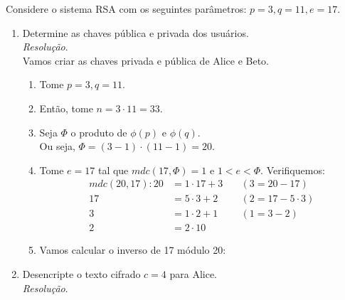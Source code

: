 Considere o sistema RSA com os seguintes parâmetros: 
$p = 3, q = 11, e = 17$. \\
\begin{enumerate}
	\item Determine as chaves pública e privada dos usuários. \\ 
	\emph{Resolução}. \\
	Vamos criar as chaves privada e pública de Alice e Beto. \\
	\begin{enumerate}
		\item Tome $p = 3, q = 11$. 
		\item Então, tome $n = 3 \cdot 11 = 33$. 
		\item Seja $\Phi$ o produto de $\phi(p)$ e $\phi(q)$. \\ 
			Ou seja, $\Phi = (3 - 1) \cdot (11 - 1) = 20$.
		\item Tome $e = 17$ tal que $mdc(17, \Phi) = 1$ e $1 < e < \Phi$. Verifiquemos:
			\begin{align*}
				mdc(20, 17): 20 &= 1 \cdot 17 + 3 &\quad (3 = 20 - 17) \\
						17 &= 5 \cdot 3 + 2 &\quad (2 = 17 - 5 \cdot 3) \\ 
						3 &= 1 \cdot 2 + 1 &\quad (1 = 3 - 2) \\ 
						2 &= 2 \cdot 1 0
			\end{align*}
		\item Vamos calcular o inverso de 17 módulo 20:

	\end{enumerate}

	\item Desencripte o texto cifrado $c = 4$ para Alice. \\
	\emph{Resolução}. \\
\end{enumerate}

